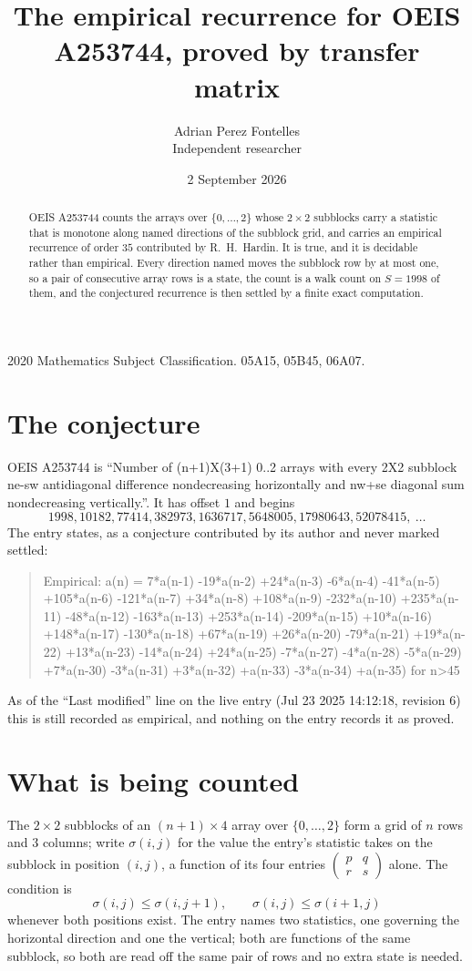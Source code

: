 \documentclass[11pt,a4paper]{article}
\title{The empirical recurrence for OEIS A253744, proved by transfer matrix}
\author{Adrian Perez Fontelles\\ \small Independent researcher}
\date{2 September 2026}
\theoremstyle{plain}
\theoremstyle{definition}
\begin{document}
\maketitle

\begin{abstract}
OEIS A253744 counts the arrays over $\{0,\dots,2\}$ whose $2\times2$ subblocks carry a
statistic that is monotone along named directions of the subblock grid, and carries an
empirical recurrence of order $35$ contributed by R.~H.~Hardin. It is true, and it is
decidable rather than empirical. Every direction named moves the subblock row by at most one,
so a pair of consecutive array rows is a state, the count is a walk count on $S=1998$ of them,
and the conjectured recurrence is then settled by a finite exact computation.
\end{abstract}

\noindent\small 2020 Mathematics Subject Classification. 05A15, 05B45, 06A07.\normalsize

\section{The conjecture}

OEIS A253744 is ``Number of (n+1)X(3+1) 0..2 arrays with every 2X2 subblock ne-sw antidiagonal difference nondecreasing horizontally and nw+se diagonal sum nondecreasing vertically.''. It has offset $1$ and begins
\[
1998, 10182, 77414, 382973, 1636717, 5648005, 17980643, 52078415,\ \dots
\]
The entry states, as a conjecture contributed by its author and never marked settled:
\begin{quote}
Empirical: a(n) = 7*a(n-1) -19*a(n-2) +24*a(n-3) -6*a(n-4) -41*a(n-5) +105*a(n-6) -121*a(n-7) +34*a(n-8) +108*a(n-9) -232*a(n-10) +235*a(n-11) -48*a(n-12) -163*a(n-13) +253*a(n-14) -209*a(n-15) +10*a(n-16) +148*a(n-17) -130*a(n-18) +67*a(n-19) +26*a(n-20) -79*a(n-21) +19*a(n-22) +13*a(n-23) -14*a(n-24) +24*a(n-25) -7*a(n-27) -4*a(n-28) -5*a(n-29) +7*a(n-30) -3*a(n-31) +3*a(n-32) +a(n-33) -3*a(n-34) +a(n-35) for n>45
\end{quote}
As of the ``Last modified'' line on the live entry (Jul 23 2025 14:12:18, revision 6) this is still
recorded as empirical, and nothing on the entry records it as proved.

\section{What is being counted}

The $2\times2$ subblocks of an $(n+1)\times4$ array over $\{0,\dots,2\}$ form a grid
of $n$ rows and $3$ columns; write $\sigma(i,j)$ for the value the entry's statistic takes on
the subblock in position $(i,j)$, a function of its four entries
$\begin{pmatrix}p&q\\r&s\end{pmatrix}$ alone. The condition is
\[
\sigma(i,j)\le\sigma(i,j+1),\qquad \sigma(i,j)\le\sigma(i+1,j)
\]
whenever both positions exist. The entry names two statistics, one governing the horizontal direction and one the vertical; both are functions of the same subblock, so both are read off the same pair of rows and no extra state is needed.
\end{document}
